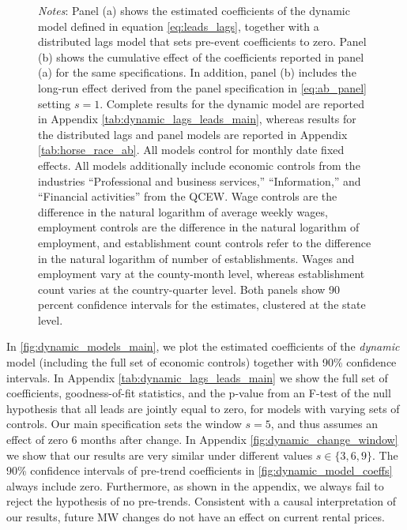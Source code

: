 \begin{figure}[htb!]
\begin{minipage}{0.95\textwidth}
		\vspace{2mm} 
		\textit{Notes}: Panel (a) shows the estimated coefficients of the dynamic model defined 
		in equation \autoref{eq:leads_lags}, together with a distributed lags model that sets 
		pre-event coefficients to zero. Panel (b) shows the cumulative effect of the coefficients 
		reported in panel (a) for the same specifications. In addition, panel (b) includes the 
		long-run effect derived from the panel specification in \autoref{eq:ab_panel} setting $s=1$. Complete 
		results for the dynamic model are reported in Appendix 
		\autoref{tab:dynamic_lags_leads_main}, whereas results for the distributed lags and panel 
		models are reported in Appendix \autoref{tab:horse_race_ab}. All models control for 
		monthly date fixed effects. All models additionally  include economic controls from the 
		industries ``Professional and business services,'' ``Information,'' and ``Financial 
		activities'' from the QCEW. Wage controls are the difference in the natural logarithm of 
		average weekly wages, employment controls are the difference in the natural logarithm of 
		employment, and establishment count controls refer to the difference in the natural 
		logarithm of number of establishments. Wages and employment vary at the county-month 
		level, whereas establishment count varies at the country-quarter level. Both panels
		show 90 percent confidence intervals for the estimates, clustered at the state level. 
	\end{minipage}
\end{figure}


In \autoref{fig:dynamic_models_main}, we plot the estimated coefficients of the \textit{dynamic} 
model (including the full set of economic controls) together with 90\% confidence intervals. In
Appendix \autoref{tab:dynamic_lags_leads_main} we show the full set of coefficients, 
goodness-of-fit statistics, and the p-value from an F-test of the null hypothesis that all leads 
are jointly equal to zero, for models with varying sets of controls. Our main specification sets 
the window $s = 5$, and thus assumes an effect of zero 6 months after change. In Appendix 
\autoref{fig:dynamic_change_window} we show that our results are very similar under different 
values $s \in \{3, 6, 9\}$. The 90\% confidence intervals of pre-trend coefficients in 
\autoref{fig:dynamic_model_coeffs} always include zero. Furthermore, as shown in the appendix, 
we always fail to reject the hypothesis of no pre-trends. Consistent with a causal interpretation 
of our results, future MW changes do not have an effect on current rental prices. 

